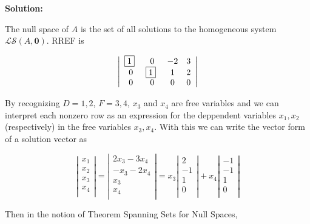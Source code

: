 \documentclass{article}
\begin{document}
\textbf{Solution:}

The null space of \(A\) is the set of all solutions to the homogeneous system \(\mathcal{LS}(A,\textbf{0})\).
RREF is

\begin{equation}
 \left| \begin{array}{ccccc}
  $\boxed{1}$~ & 0 & -2 & 3 \\
  0 & $\boxed{1}$~ & 1 & 2 \\
  0 & 0 & 0 & 0
  \end{array} \right|
\end{equation}

By recognizing \(D={1,2}\), \(F={3,4}\), \(x_3\) and \(x_4\) are free variables and we can interpret each nonzero row as an expression for the deppendent variables \(x_1,x_2\) (respectively) in the free variables \(x_3,x_4\).
With this we can write the vector form of a solution vector as

\begin{equation}
  \left| \begin{array}{ccccc}
    x_1 \\
    x_2 \\
    x_3 \\
    x_4 \\
  \end{array} \right|
=
\left| \begin{array}{ccccc}
  2x_3 - 3x_4 \\
  -x_3 - 2x_4 \\
  x_3 \\
  x_4 \\
\end{array} \right|
=
x_3
\left| \begin{array}{ccccc}
  2 \\
  -1 \\
  1 \\
  0 \\
\end{array} \right|
+
x_4
\left| \begin{array}{ccccc}
  -1 \\
  -1 \\
  1 \\
  0 \\
\end{array} \right|
\end{equation}

Then in the notion of Theorem Spanning Sets for Null Spaces,
\end{document}
